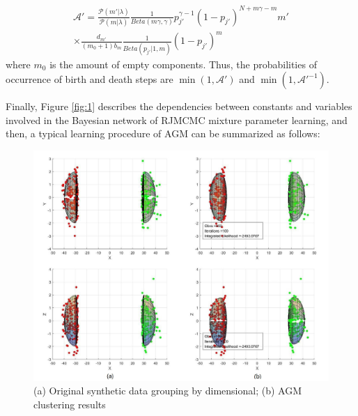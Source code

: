 \documentclass[conference]{IEEEtran}
\begin{document}
\begin{multline}
\mathcal{A}'=\frac{\mathcal{P}(m'|\lambda)}{\mathcal{P}(m|\lambda)}\frac{1}{Beta(m\gamma,\gamma)}p_{j'}^{\gamma-1}(1-p_{j'})^{N+m\gamma-m}m' \\
\times \frac{d_{m'}}{(m_0+1)b_m}\frac{1}{Beta(p_{j'}|1,m)}(1-p_{j'})^m\qquad\quad
\label{eq:acptProBD}
\end{multline}
where $m_0$ is the amount of empty components. Thus, the probabilities of occurrence of birth and death steps are $\min(1,\mathcal{A}')$ and $\min(1,\mathcal{A}'^{-1})$\cite{Richardson1997}.

Finally, Figure \ref{fig:1} describes the dependencies between constants and variables involved in the Bayesian network of RJMCMC mixture parameter learning, and then, a typical learning procedure of AGM can be summarized as follows:
\bigskip


\begin{figure}[b]
\centering
\includegraphics[width=0.4\paperwidth]{xyzMerge.jpg}
\caption{(a) Original synthetic data grouping by dimensional; (b) AGM clustering results}
\label{fig:2}
\end{figure}
\end{document}

